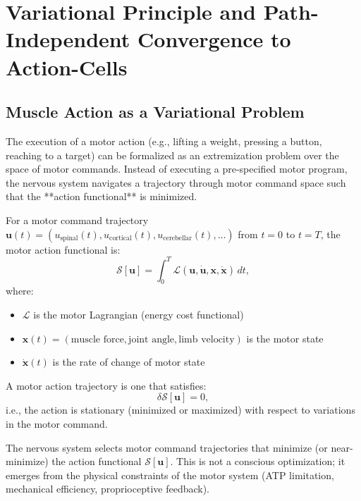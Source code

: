 \section{Variational Principle and Path-Independent Convergence to Action-Cells}
\label{sec:variational-principle}

\subsection{Muscle Action as a Variational Problem}
\label{subsec:variational-formulation}

The execution of a motor action (e.g., lifting a weight, pressing a button, reaching to a target) can be formalized as an extremization problem over the space of motor commands. Instead of executing a pre-specified motor program, the nervous system navigates a trajectory through motor command space such that the **action functional** is minimized.

\begin{definition}
\label{def:action-functional}
For a motor command trajectory $\mathbf{u}(t) = (u_{\text{spinal}}(t), u_{\text{cortical}}(t), u_{\text{cerebellar}}(t), \ldots)$ from $t=0$ to $t=T$, the motor action functional is:
\begin{equation}
  \mathcal{S}[\mathbf{u}] = \int_0^T \mathcal{L}(\mathbf{u}, \dot{\mathbf{u}}, \mathbf{x}, \dot{\mathbf{x}}) \, dt,
\end{equation}
where:
\begin{itemize}[noitemsep]
\item $\mathcal{L}$ is the motor Lagrangian (energy cost functional)
\item $\mathbf{x}(t) = (\text{muscle force}, \text{joint angle}, \text{limb velocity})$ is the motor state
\item $\dot{\mathbf{x}}(t)$ is the rate of change of motor state
\end{itemize}

A motor action trajectory is one that satisfies:
\begin{equation}
  \delta \mathcal{S}[\mathbf{u}] = 0,
\end{equation}
i.e., the action is stationary (minimized or maximized) with respect to variations in the motor command.
\end{definition}

\begin{principle}
The nervous system selects motor command trajectories that minimize (or near-minimize) the action functional $\mathcal{S}[\mathbf{u}]$. This is not a conscious optimization; it emerges from the physical constraints of the motor system (ATP limitation, mechanical efficiency, proprioceptive feedback).
\end{principle}

